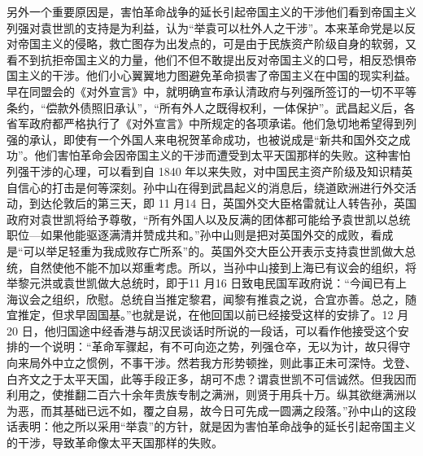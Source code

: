 另外一个重要原因是，害怕革命战争的延长引起帝国主义的干涉他们看到帝国主义列强对袁世凯的支持是为利益，认为“举袁可以杜外人之干涉”。本来革命党是以反对帝国主义的侵略，救亡图存为出发点的，可是由于民族资产阶级自身的软弱，又看不到抗拒帝国主义的力量，他们不但不敢提出反对帝国主义的口号，相反恐惧帝国主义的干涉。他们小心翼翼地力图避免革命损害了帝国主义在中国的现实利益。早在同盟会的《对外宣言》中，就明确宣布承认清政府与列强所签订的一切不平等条约，“偿款外债照旧承认”，“所有外人之既得权利，一体保护”。武昌起义后，各省军政府都严格执行了《对外宣言》中所规定的各项承诺。他们急切地希望得到列强的承认，即使有一个外国人来电祝贺革命成功，也被说成是“新共和国外交之成功”。他们害怕革命会因帝国主义的干涉而遭受到太平天国那样的失败。这种害怕列强干涉的心理，可以看到自 1840 年以来失败，对中国民主资产阶级及知识精英自信心的打击是何等深刻。孙中山在得到武昌起义的消息后，绕道欧洲进行外交活动，到达伦敦后的第三天，即 11 月14 日，英国外交大臣格雷就让人转告孙，英国政府对袁世凯将给予尊敬，“所有外国人以及反满的团体都可能给予袁世凯以总统职位—如果他能驱逐满清并赞成共和。”孙中山则是把对英国外交的成败，看成是“可以举足轻重为我成败存亡所系”的。英国外交大臣公开表示支持袁世凯做大总统，自然使他不能不加以郑重考虑。所以，当孙中山接到上海已有议会的组织，将举黎元洪或袁世凯做大总统时，即于11 月16 日致电民国军政府说：“今闻已有上海议会之组织，欣慰。总统自当推定黎君，闻黎有推袁之说，合宜亦善。总之，随宜推定，但求早固国基。”也就是说，在他回国以前已经接受这样的安排了。12 月20 日，他归国途中经香港与胡汉民谈话时所说的一段话，可以看作他接受这个安排的一个说明：“革命军骤起，有不可向迩之势，列强仓卒，无以为计，故只得守向来局外中立之惯例，不事干涉。然若我方形势顿挫，则此事正未可深恃。戈登、白齐文之于太平天国，此等手段正多，胡可不虑？谓袁世凯不可信诚然。但我因而利用之，使推翻二百六十余年贵族专制之满洲，则贤于用兵十万。纵其欲继满洲以为恶，而其基础已远不如，覆之自易，故今日可先成一圆满之段落。”孙中山的这段话表明：他之所以采用“举袁”的方针，就是因为害怕革命战争的延长引起帝国主义的干涉，导致革命像太平天国那样的失败。

